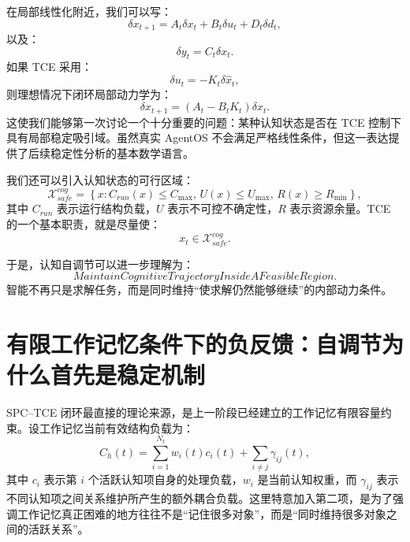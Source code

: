 在局部线性化附近，我们可以写：
\begin{equation}
\delta x_{t+1}
=
A_t\delta x_t
+
B_t\delta u_t
+
D_t\delta d_t,
\end{equation}
以及：
\begin{equation}
\delta y_t
=
C_t\delta x_t.
\end{equation}
如果 TCE 采用：
\begin{equation}
\delta u_t
=
-K_t\delta\hat{x}_t,
\end{equation}
则理想情况下闭环局部动力学为：
\begin{equation}
\delta x_{t+1}
=
(A_t-B_tK_t)
\delta x_t.
\end{equation}
这使我们能够第一次讨论一个十分重要的问题：某种认知状态是否在 TCE 控制下具有局部稳定吸引域。虽然真实 AgentOS 不会满足严格线性条件，但这一表达提供了后续稳定性分析的基本数学语言。

我们还可以引入认知状态的可行区域：
\begin{equation}
\mathcal X_{safe}^{cog}
=
\left\{
x:
C_{run}(x)\le C_{\max},
\,
U(x)\le U_{\max},
\,
R(x)\ge R_{\min}
\right\},
\end{equation}
其中 $C_{run}$ 表示运行结构负载，$U$ 表示不可控不确定性，$R$ 表示资源余量。TCE 的一个基本职责，就是尽量使：
\begin{equation}
x_t\in\mathcal X_{safe}^{cog}.
\end{equation}

于是，认知自调节可以进一步理解为：
\begin{equation}
\boxed{
MaintainCognitiveTrajectory
InsideAFeasibleRegion.
}
\end{equation}
智能不再只是求解任务，而是同时维持``使求解仍然能够继续''的内部动力条件。

\section{有限工作记忆条件下的负反馈：自调节为什么首先是稳定机制}

SPC--TCE 闭环最直接的理论来源，是上一阶段已经建立的工作记忆有限容量约束。设工作记忆当前有效结构负载为：
\begin{equation}
C_h(t)
=
\sum_{i=1}^{N_t}
w_i(t)c_i(t)
+
\sum_{i\neq j}
\gamma_{ij}(t),
\label{eq:working-memory-structural-load}
\end{equation}
其中 $c_i$ 表示第 $i$ 个活跃认知项自身的处理负载，$w_i$ 是当前认知权重，而 $\gamma_{ij}$ 表示不同认知项之间关系维护所产生的额外耦合负载。这里特意加入第二项，是为了强调工作记忆真正困难的地方往往不是``记住很多对象''，而是``同时维持很多对象之间的活跃关系''。

